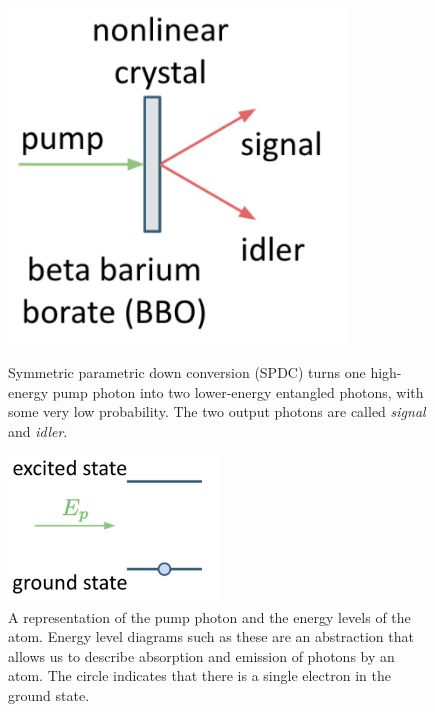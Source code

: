 \begin{figure}[H]
    \centering
    \includegraphics[width=0.8\textwidth]{lesson4/pump.pdf}
    \label{fig:spdc}
    \begin{center}
        \caption{Symmetric parametric down conversion (SPDC) turns one high-energy pump photon into two lower-energy entangled photons, with some very low probability. The two output photons are called \emph{signal} and \emph{idler}.}
    \end{center}
\end{figure}

\begin{figure}[H]
    \centering
    \includegraphics[width=0.5\textwidth]{lesson4/state1.pdf}
    \begin{center}
        \caption{A representation of the pump photon and the energy levels of the atom. Energy level diagrams such as these are an abstraction that allows us to describe absorption and emission of photons by an atom. The circle indicates that there is a single electron in the ground state. }
    \end{center}
    \label{fig:spdc-energy-levels}
\end{figure}

